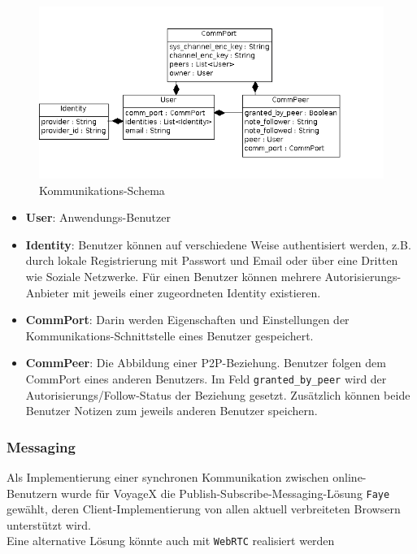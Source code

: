   \begin{figure}[H]
      \centering
	  \includegraphics[scale=0.6]{bilder/uml/er_user.png}
  	  \caption{Kommunikations-Schema}
  \end{figure}
\begin{itemize}[leftmargin=*,noitemsep,topsep=1ex,parsep=0pt,partopsep=0pt]
\item \textbf{User}: Anwendungs-Benutzer
\item \textbf{Identity}: Benutzer können auf verschiedene Weise authentisiert werden, z.B. durch lokale Registrierung mit Passwort und Email oder über eine Dritten wie Soziale Netzwerke. Für einen Benutzer können mehrere Autorisierungs-Anbieter mit jeweils einer zugeordneten Identity existieren.
\item \textbf{CommPort}: Darin werden Eigenschaften und Einstellungen der Kommunikations-Schnittstelle eines Benutzer gespeichert.
\item \textbf{CommPeer}: Die Abbildung einer P2P-Beziehung. Benutzer folgen dem CommPort eines anderen Benutzers. Im Feld \texttt{granted\_by\_peer} wird der Autorisierungs/Follow-Status der Beziehung gesetzt. Zusätzlich können beide Benutzer Notizen zum jeweils anderen Benutzer speichern.
\end{itemize}

\subsubsection{Messaging}\label{5_MESSGNG}
Als Implementierung einer synchronen Kommunikation zwischen online-Benutzern wurde für VoyageX die Publish-Subscribe-Messaging-Lösung \texttt{Faye} gewählt, deren Client-Implementierung von allen aktuell verbreiteten Browsern unterstützt wird.\\
Eine alternative Lösung könnte auch mit \texttt{WebRTC} realisiert werden

